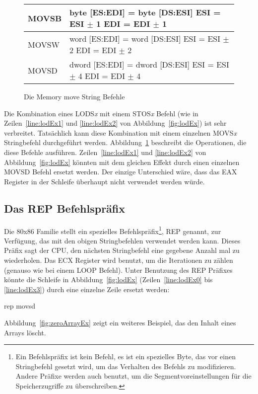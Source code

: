 \begin{figure}[t]
\centering
{\code
\begin{tabular}{|lp{2.5in}|}
 \hline
 MOVSB & byte [ES:EDI] = byte [DS:ESI] \newline
        ESI = ESI $\pm$ 1 \newline
        EDI = EDI $\pm$ 1 \\
 \hline
 MOVSW & word [ES:EDI] = word [DS:ESI] \newline
        ESI = ESI $\pm$ 2 \newline
        EDI = EDI $\pm$ 2 \\
 \hline
 MOVSD & dword [ES:EDI] = dword [DS:ESI] \newline
        ESI = ESI $\pm$ 4 \newline
        EDI = EDI $\pm$ 4 \\
 \hline
\end{tabular}
} \caption{Die Memory move String Befehle \label{fig:movString}
}
\end{figure}

Die Kombination eines {\code LODS\emph{x}} mit einem {\code
STOS\emph{x}} Befehl (wie in Zeilen~\ref{line:lodEx1} und
\ref{line:lodEx2}  von Abbildung~\ref{fig:lodEx}) ist sehr
verbreitet. Tats\"{a}chlich kann diese Kombination mit einem einzelnen
{\code MOVS\emph{x}} Stringbefehl durchgef\"{u}hrt werden.
Abbildung~\ref{fig:movString} beschreibt die Operationen, die diese
Befehle ausf\"{u}hren. Zeilen~\ref{line:lodEx1} und \ref{line:lodEx2}
von Abbildung~\ref{fig:lodEx} k\"{o}nnten mit dem gleichen Effekt durch
einen einzelnen {\code MOVSD} Befehl ersetzt werden. Der einzige
Unterschied w\"{a}re, dass das EAX Register in der Schleife \"{u}berhaupt
nicht verwendet werden w\"{u}rde.

\subsection{Das {\code REP} Befehlspr\"{a}fix
}

Die 80x86 Familie stellt ein spezielles Befehlspr\"{a}fix\footnote{Ein
Befehlspr\"{a}fix ist kein Befehl, es ist ein spezielles Byte, das vor
einen Stringbefehl gesetzt wird, um das Verhalten des Befehls zu
modifizieren. Andere Pr\"{a}fixe werden auch benutzt, um die
Segmentvoreinstellungen f\"{u}r die Speicherzugriffe zu \"{u}berschreiben.},
{\code REP} genannt, zur Verf\"{u}gung, das mit den obigen
Stringbefehlen verwendet werden kann. Dieses Pr\"{a}fix sagt der CPU,
den n\"{a}chsten Stringbefehl eine gegebene Anzahl mal zu wiederholen.
Das ECX Register wird benutzt, um die Iterationen zu z\"{a}hlen (genauso
wie bei einem {\code LOOP} Befehl). Unter Benutzung des {\code REP}
Pr\"{a}fixes k\"{o}nnte die Schleife in Abbildung~\ref{fig:lodEx}
(Zeilen~\ref{line:lodEx0} bis \ref{line:lodEx3}) durch eine einzelne
Zeile ersetzt werden:
\begin{AsmCodeListing}[frame=none, numbers=none]
      rep movsd
\end{AsmCodeListing}
Abbildung~\ref{fig:zeroArrayEx} zeigt ein weiteres Beispiel, das den
Inhalt eines Arrays l\"{o}scht. 

